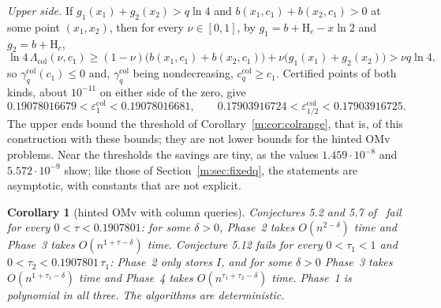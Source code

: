 \documentclass[11pt]{article}
\newtheorem{corollary}[theorem]{Corollary}
\theoremstyle{definition}
\theoremstyle{remark}
\newcommand{\Hh}{\mathrm{H}}
\newcommand{\HintedOMvRtwenty}{0.1907801}%
\newcommand{\ColOneLo}{0.19078016679}%
\newcommand{\ColOneHi}{0.19078016681}%
\newcommand{\ColHalfLo}{0.17903916724}%
\newcommand{\ColHalfHi}{0.17903916725}%
\newcommand{\ColGammaOne}{1.459\cdot10^{-8}}%
\newcommand{\ColGammaHalf}{5.572\cdot10^{-9}}%
\begin{document}
\emph{Upper side.} If $g_1(x_1)+g_2(x_2)>q\ln4$ and $b(x_1,c_1)+b(x_2,c_1)>0$ at some point $(x_1,x_2)$, then for every $\nu\in[0,1]$, by $g_1=b+\Hh_c-x\ln2$ and $g_2=b+\Hh_c$,
\[
\ln4\,\Lambda_{\mathrm{col}}(\nu,c_1)\ge(1-\nu)\big(b(x_1,c_1)+b(x_2,c_1)\big)+\nu\big(g_1(x_1)+g_2(x_2)\big)>\nu q\ln4,
\]
so $\gamma^{\mathrm{col}}_q(c_1)\le0$ and, $\gamma^{\mathrm{col}}_q$ being nondecreasing, $c^{\mathrm{col}}_q\ge c_1$. Certified points of both kinds, about $10^{-11}$ on either side of the zero, give
\[
\ColOneLo<\varepsilon^{\mathrm{col}}_1<\ColOneHi,\qquad\ColHalfLo<\varepsilon^{\mathrm{col}}_{1/2}<\ColHalfHi .
\]
The upper ends bound the threshold of Corollary~\ref{m:cor:colrange}, that is, of this construction with these bounds; they are not lower bounds for the hinted OMv problems. Near the thresholds the savings are tiny, as the values $\ColGammaOne$ and $\ColGammaHalf$ show; like those of Section~\ref{m:sec:fixedq}, the statements are asymptotic, with constants that are not explicit.

\begin{corollary}[hinted OMv with column queries]\label{m:cor:omvcol}
Conjectures 5.2 and 5.7 of~\cite{BNS19} fail for every $0<\tau<\HintedOMvRtwenty$: for some $\delta>0$, Phase~2 takes $O(n^{2-\delta})$ time and Phase~3 takes $O(n^{1+\tau-\delta})$ time. Conjecture 5.12 fails for every $0<\tau_1<1$ and $0<\tau_2<\HintedOMvRtwenty\,\tau_1$: Phase~2 only stores $I$, and for some $\delta>0$ Phase~3 takes $O(n^{1+\tau_1-\delta})$ time and Phase~4 takes $O(n^{\tau_1+\tau_2-\delta})$ time. Phase~1 is polynomial in all three. The algorithms are deterministic.
\end{corollary}
\end{document}
